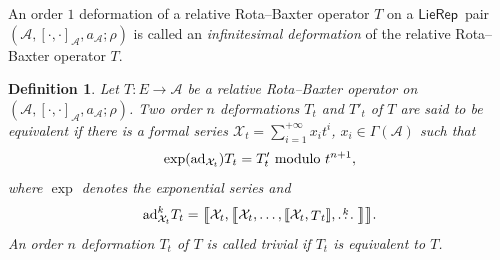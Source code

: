 \documentclass[pdftex]{sigma}%
\numberwithin{equation}{section}
\newtheorem{defi}[thm]{Definition}
\newcommand{\huaA}{\mathcal{A}}
\newcommand{\huaX}{\mathcal{X}}
\newcommand{\ad}{\mathrm{ad}}
\newcommand{\LP}{$\mathsf{LieRep}$~}
\begin{document}
An order $1$ deformation of a relative Rota--Baxter operator $T$ on a \LP pair $(\huaA,[\cdot,\cdot]_\huaA,a_\huaA;\rho)$ is called an {\it infinitesimal deformation} of the relative Rota--Baxter operator $T$.



\begin{defi}%
Let $T\colon E\longrightarrow \huaA$ be a relative Rota--Baxter operator on $(\huaA,[\cdot,\cdot]_\huaA,a_\huaA;\rho)$. Two order $n$ deformations $T_t$ and $T'_t$ of $T$ are said to be {\it equivalent} if there is a formal series $\huaX_t=\sum_{i=1}^{+\infty}x_it^i$, $x_i\in \Gamma(\huaA) $ such that
\begin{gather}\label{eq:equivalent 2-1}
{\rm exp}(\ad_{\huaX_t})T_t=T_t' \mbox{ modulo } t^{n+1},
\end{gather}
 where ${\exp}$ denotes the exponential series and
\begin{gather*}
\ad^k_{\huaX_t}T_t=\big[\hspace{-3pt}\big[\huaX_t,\big[\hspace{-3pt}\big[\huaX_t,\dots,[\hspace{-1.5pt}[\huaX_t,\stackrel{}T_t
]\hspace{-1.5pt}],\stackrel{k}{\dots}\big]\hspace{-3pt}\big] \big]\hspace{-3pt}\big].
\end{gather*}
An order $n$ deformation $T_t$ of $T$ is called {\it trivial} if $T_t$ is equivalent to $T$.
\end{defi}
\end{document}
